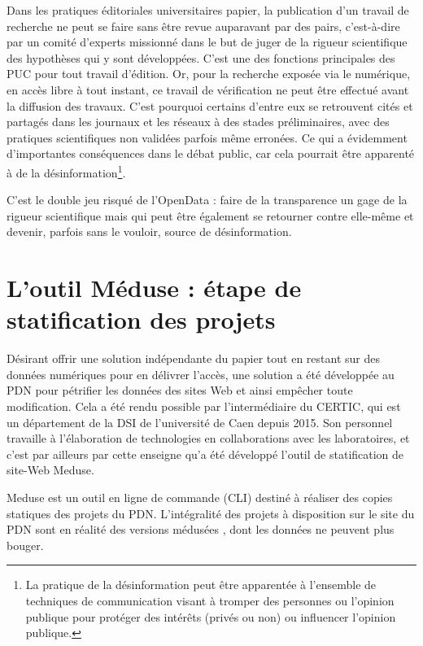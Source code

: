 \documentclass[a4paper,12pt,twoside]{book}
\begin{document}
Dans les pratiques éditoriales universitaires papier, la publication d'un travail de recherche ne peut se faire sans être revue auparavant par des pairs, c'est-à-dire par un comité d'experts missionné dans le but de juger de la rigueur scientifique des hypothèses qui y sont développées. C'est une des fonctions principales des \acrshort{PUC} pour tout travail d'édition. Or, pour la recherche exposée via le numérique, en accès libre à tout instant, ce travail de vérification ne peut être effectué avant la diffusion des travaux. C'est pourquoi certains d'entre eux se retrouvent cités et partagés dans les journaux et les réseaux à des stades préliminaires, avec des pratiques scientifiques non validées parfois même erronées. Ce qui a évidemment d'importantes conséquences dans le débat public, car cela pourrait être apparenté à de la désinformation\footnote{La pratique de la désinformation peut être apparentée à l'ensemble de techniques de communication visant à tromper des personnes ou l'opinion publique pour protéger des intérêts (privés ou non) ou influencer l'opinion publique.}.

C'est le double jeu risqué de l'OpenData : faire de la transparence un gage de la rigueur scientifique mais qui peut être également se retourner contre elle-même et devenir, parfois sans le vouloir, source de désinformation.
     
    
 \section{L'outil Méduse : étape de statification des projets}
    
 Désirant offrir une solution indépendante du papier tout en restant sur des données numériques pour en délivrer l'accès, une solution a été développée au \acrshort{PDN} pour \og pétrifier \fg les données des sites Web et ainsi empêcher toute modification. Cela a été rendu possible par l'intermédiaire du \acrfull{CERTIC}, qui est un département de la \acrfull{DSI} de l'université de Caen depuis 2015. Son personnel travaille à l'élaboration de technologies en collaborations avec les laboratoires, et c'est par ailleurs par cette enseigne qu'a été développé l'outil de statification de site-Web Meduse.
    
    
Meduse est un outil en ligne de commande (\acrshort{CLI}) destiné à réaliser des copies statiques des projets du \acrshort{PDN}. L'intégralité des projets à disposition sur le site du \acrshort{PDN} sont en réalité des versions \og médusées \fg, dont les données ne peuvent plus bouger.
\end{document}
